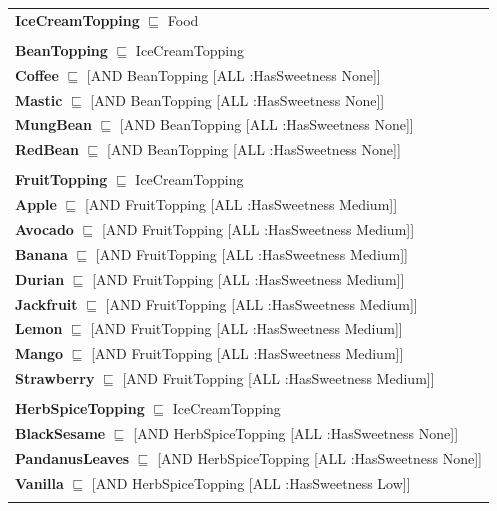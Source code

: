 \documentclass[12pt]{article}
\begin{document}
\begin{tabularx}{1\textwidth}{@{}X@{}}
            \textbf{IceCreamTopping} $\sqsubseteq$ Food \\ \tabularnewline
            
            \textbf{BeanTopping} $\sqsubseteq$ IceCreamTopping \\
                \textbf{Coffee} $\sqsubseteq$ [AND BeanTopping [ALL :HasSweetness None]] \\
                \textbf{Mastic} $\sqsubseteq$ [AND BeanTopping [ALL :HasSweetness None]] \\
                \textbf{MungBean} $\sqsubseteq$ [AND BeanTopping [ALL :HasSweetness None]] \\
                \textbf{RedBean} $\sqsubseteq$ [AND BeanTopping [ALL :HasSweetness None]] \\ \tabularnewline
            
            \textbf{FruitTopping} $\sqsubseteq$ IceCreamTopping \\
                \textbf{Apple} $\sqsubseteq$ [AND FruitTopping [ALL :HasSweetness Medium]] \\
                \textbf{Avocado} $\sqsubseteq$ [AND FruitTopping [ALL :HasSweetness Medium]] \\
                \textbf{Banana} $\sqsubseteq$ [AND FruitTopping [ALL :HasSweetness Medium]] \\
                \textbf{Durian} $\sqsubseteq$ [AND FruitTopping [ALL :HasSweetness Medium]] \\
                \textbf{Jackfruit} $\sqsubseteq$ [AND FruitTopping [ALL :HasSweetness Medium]] \\
                \textbf{Lemon} $\sqsubseteq$ [AND FruitTopping [ALL :HasSweetness Medium]] \\
                \textbf{Mango} $\sqsubseteq$ [AND FruitTopping [ALL :HasSweetness Medium]] \\
                \textbf{Strawberry} $\sqsubseteq$ [AND FruitTopping [ALL :HasSweetness Medium]] \\ \tabularnewline
            
            \textbf{HerbSpiceTopping} $\sqsubseteq$ IceCreamTopping \\
                \textbf{BlackSesame} $\sqsubseteq$ [AND HerbSpiceTopping [ALL :HasSweetness None]] \\
                \textbf{PandanusLeaves} $\sqsubseteq$ [AND HerbSpiceTopping [ALL :HasSweetness None]] \\
                \textbf{Vanilla} $\sqsubseteq$ [AND HerbSpiceTopping [ALL :HasSweetness Low]] \\ \tabularnewline
            

\end{tabularx}
\end{document}
